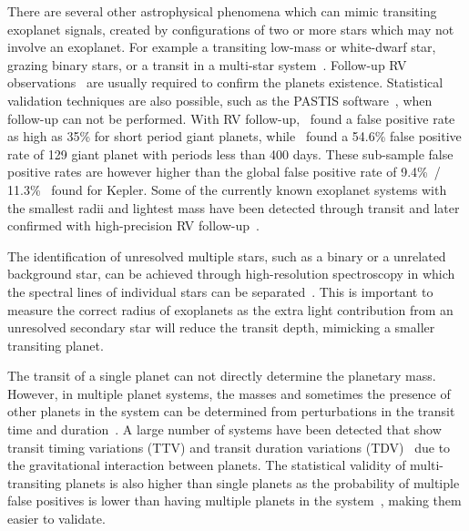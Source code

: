 There are several other astrophysical phenomena which can mimic transiting exoplanet signals, created by configurations of two or more stars which may not involve an exoplanet.
For example a transiting low-mass or white-dwarf star, grazing binary stars, or a transit in a multi-star system~\citep[see e.g.][]{cameron_extrasolar_2012, santerne_contribution_2013}.
Follow-up {RV} observations~\citep[e.g.][]{santerne_radial_2011} are usually required to confirm the planets existence.
Statistical validation techniques are also possible, such as the PASTIS software~\citep{diaz_pastis_2014}, when follow-up can not be performed.
With {RV} follow-up,~\citet{santerne_sophie_2012} found a false positive rate as high as 35\% for short period giant planets, while~\citet{santerne_sophie_2016} found a 54.6\% false positive rate of 129 giant planet with periods less than 400 days.
These sub-sample false positive rates are however higher than the global false positive rate of 9.4\%~\citep{fressin_false_2013}/ 11.3\%~\citep{santerne_contribution_2013} found for Kepler.
Some of the currently known exoplanet systems with the smallest radii and lightest mass have been detected through transit and later confirmed with high-precision {RV} follow-up~\citep[e.g.][]{queloz_corot7_2009, pepe_earthsized_2013, lopez-morales_kepler21b_2016, ment_second_2018}.

The identification of unresolved multiple stars, such as a binary or a unrelated background star, can be achieved through high-resolution spectroscopy in which the spectral lines of individual stars can be separated~\citep{kolbl_detection_2015}.
This is important to measure the correct radius of exoplanets as the extra light contribution from an unresolved secondary star will reduce the transit depth, mimicking a smaller transiting planet.

The transit of a single planet can not directly determine the planetary mass.
However, in multiple planet systems, the masses and sometimes the presence of other planets in the system can be determined from perturbations in the transit time and duration~\citep[e.g.][]{holman_use_2005, holman_kepler9_2010}.
A large number of systems have been detected that show transit timing variations (TTV) and transit duration variations (TDV)~\citep[e.g.][]{holczer_transit_2016} due to the gravitational interaction between planets.
The statistical validity of multi-transiting planets is also higher than single planets as the probability of multiple false positives is lower than having multiple planets in the system~\citep{lissauer_almost_2012}, making them easier to validate.


